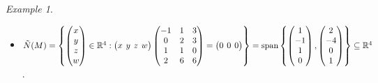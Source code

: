 \documentclass{article}
\theoremstyle{remark}
\newtheorem{example}[theorem]{Example}
\newcommand\spans{\mathrm{span}}
\begin{document}
\begin{example}
\begin{itemize}
            \item $\tilde{N}(M)=\left\{\begin{pmatrix}x\\y\\z\\w\\\end{pmatrix}\in\mathbb{R}^4:\setlength{\arraycolsep}{2pt}\begin{pmatrix}x&y&z&w\\\end{pmatrix}\setlength{\arraycolsep}{5pt}\begin{pmatrix}-1&1&3\\0&2&3\\1&1&0\\2&6&6\\\end{pmatrix}=\setlength{\arraycolsep}{2pt}\begin{pmatrix}0&0&0\\\end{pmatrix}\setlength{\arraycolsep}{5pt}\right\}=\spans\left\{\begin{pmatrix}1\\-1\\1\\0\end{pmatrix},\begin{pmatrix}2\\-4\\0\\1\\\end{pmatrix}\right\}\subseteq\mathbb{R}^4$.
        \end{itemize}
    \end{example}
\end{document}
